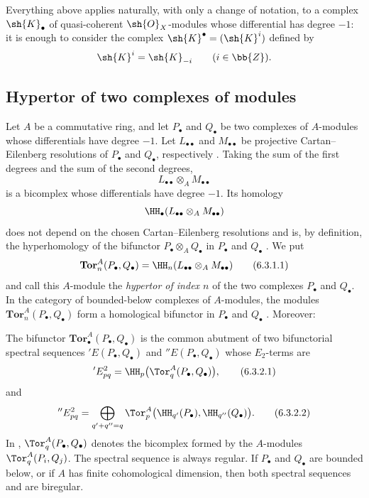 \begin{env}[6.2.7]
\label{III.6.2.7}
Everything above applies naturally, with only a change of notation,
to a complex $\sh{K}_\bullet$ of quasi-coherent
$\sh{O}_X$-modules whose differential has degree $-1$: it is
enough to consider the complex
$\sh{K}^\bullet=(\sh{K}^i)$ defined by
\[
  \sh{K}^i=\sh{K}_{-i}
  \qquad(i\in\bb{Z}).
\]
\end{env}


\subsection{Hypertor of two complexes of modules}
\label{subsection:III.6.3}

\begin{env}[6.3.1]
\label{III.6.3.1}
Let $A$ be a commutative ring, and let $P_\bullet$ and
$Q_\bullet$ be two complexes of $A$-modules whose differentials
have degree $-1$.  Let $L_{\bullet\bullet}$ and
$M_{\bullet\bullet}$ be projective Cartan--Eilenberg resolutions
of $P_\bullet$ and $Q_\bullet$, respectively
.  Taking the sum of the first degrees and the
sum of the second degrees,
\[
  L_{\bullet\bullet}\otimes_A M_{\bullet\bullet}
\]
is a bicomplex whose differentials have degree $-1$.  Its homology
\[
  \HH_\bullet(
    L_{\bullet\bullet}\otimes_A M_{\bullet\bullet}
  )
\]
does not depend on the chosen Cartan--Eilenberg resolutions and is,
by definition, the hyperhomology of the bifunctor
$P_\bullet\otimes_AQ_\bullet$ in $P_\bullet$ and $Q_\bullet$
.  We put
\[
  \mathbf{Tor}_n^A(P_\bullet,Q_\bullet)
  =
  \HH_n(L_{\bullet\bullet}\otimes_A M_{\bullet\bullet})
  \tag{6.3.1.1}\label{III.6.3.1.1}
\]
and call this $A$-module the \emph{hypertor of index $n$} of the
two complexes $P_\bullet$ and $Q_\bullet$.  In the category of
bounded-below complexes of $A$-modules, the modules
$\mathbf{Tor}_n^A(P_\bullet,Q_\bullet)$ form a homological
bifunctor in $P_\bullet$ and $Q_\bullet$
.  Moreover:
\end{env}

\begin{proposition}[6.3.2]
\label{III.6.3.2}
The bifunctor $\mathbf{Tor}_\bullet^A(P_\bullet,Q_\bullet)$ is the
common abutment of two bifunctorial spectral sequences
$'E(P_\bullet,Q_\bullet)$ and $''E(P_\bullet,Q_\bullet)$ whose
$E_2$-terms are
\[
  'E_{pq}^2
  =
  \HH_p\bigl(\Tor_q^A(P_\bullet,Q_\bullet)\bigr),
  \tag{6.3.2.1}\label{III.6.3.2.1}
\]
and
\[
  ''E_{pq}^2
  =
  \bigoplus_{q'+q''=q}
  \Tor_p^A\bigl(
    \HH_{q'}(P_\bullet),\HH_{q''}(Q_\bullet)
  \bigr).
  \tag{6.3.2.2}\label{III.6.3.2.2}
\]
In ,
$\Tor_q^A(P_\bullet,Q_\bullet)$ denotes the bicomplex formed by
the $A$-modules $\Tor_q^A(P_i,Q_j)$.  The spectral sequence
 is always regular.  If $P_\bullet$ and
$Q_\bullet$ are bounded below, or if $A$ has finite cohomological
dimension, then both spectral sequences
 and  are biregular.
\end{proposition}

